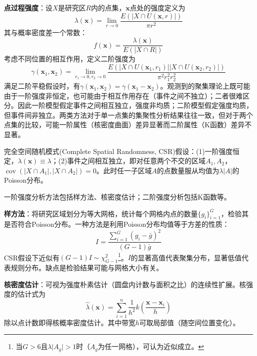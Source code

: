 \par \textbf{点过程强度}：设$X$是研究区$R$内的点集，$\mathbf{x}$点处的强度定义为
\begin{equation*}
\lambda(\mathbf{x})=\lim\limits_{r\to 0}\frac{E(\vert X\cap U(\mathbf{x},r) \vert)}{\pi r^2}
\end{equation*}
其与概率密度差一个常数：
\begin{equation}
f(\mathbf{x})=\frac{\lambda(\mathbf{x})}{E(\vert X\cap R \vert)}
\end{equation}
考虑不同位置的相互作用，定义二阶强度为
\begin{equation*}
\gamma(\mathbf{x}_1,\mathbf{x}_2)=\lim\limits_{r_1\to 0,r_2\to 0}\frac{E(\vert X\cap U(\mathbf{x}_1,r_1) \vert\vert X\cap U(\mathbf{x}_2,r_2) \vert)}{\pi^2 r_1^2r_2^2}
\end{equation*}
满足二阶平稳假设时，有$\gamma(\mathbf{x}_1,\mathbf{x}_2)=\gamma(\mathbf{x}_1-\mathbf{x}_2)$。观测到的聚集理论上既可能由于一阶强度非恒定，也可能由于相互作用存在（事件之间不独立）；二者很难区分。因此一阶模型假定事件之间相互独立，强度非均质；二阶模型假定强度均质，但事件间非独立。两类方法对于单一点集的集聚性分析结果往往一致，但对于两个点集的比较，可能一阶属性（核密度曲面）差异显著而二阶属性（K函数）差异不显著。

\par 完全空间随机模式(Complete Spatial Randomness, CSR)假设：(1)一阶强度恒定，$\lambda(\mathbf{x})\equiv \lambda$；(2)事件之间相互独立，即对任意两个不交的区域$A_1,A_2$，$\operatorname{cov}(\vert X\cap A_1\vert,\vert X\cap A_2\vert)=0$。此时任一子区域$A$的点数量服从均值为$\lambda \vert A \vert$的Poisson分布。

\par 一阶强度分析方法包括样方法、核密度估计；二阶强度分析包括K函数等。

\par \textbf{样方法}：将研究区域划分为等大网格，统计每个网格内点的数量$\{g_i\}_{i=1}^G$，检验其是否符合Poisson分布。一种方法是利用Poisson分布均值等于方差的性质：
\begin{equation}
    I = \frac{\sum_{i=1}^G (g_i-\bar{g})^2}{(G-1)\bar{g}}
\end{equation}
CSR假设下近似有$(G-1)I \sim \chi_{G-1}^2$\footnote{当$G>6$且$\lambda\vert A_g\vert>1$时（$A_g$为任一网格），可认为近似成立。}。$I$的显著高值代表聚集分布，显著低值代表规则分布。缺点是检验结果可能与网格大小有关。

\par \textbf{核密度估计}：可视为强度朴素估计（圆盘内计数与面积之比）的连续性扩展。核强度的估计式为
\begin{equation}
    \hat{\lambda}(\mathbf{x})=\sum_{i=1}^n \frac{1}{h^2} k\left(\frac{\mathbf{x}-\mathbf{x}_i}{h}\right)
\end{equation}
除以点计数即得核概率密度估计。其中带宽$h$可取局部值（随空间位置变化）。

